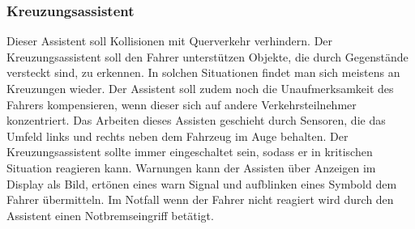         \subsubsection{Kreuzungsassistent}
        Dieser Assistent soll Kollisionen mit Querverkehr verhindern. Der Kreuzungsassistent soll den Fahrer 
        unterstützen Objekte, die durch Gegenstände versteckt sind, zu erkennen. In solchen Situationen findet 
        man sich meistens an Kreuzungen wieder. Der Assistent soll zudem noch die Unaufmerksamkeit des 
        Fahrers kompensieren, wenn dieser sich auf andere Verkehrsteilnehmer konzentriert. Das Arbeiten  
        dieses Assisten geschieht durch Sensoren, die das Umfeld links und rechts neben dem Fahrzeug  im 
        Auge behalten. Der Kreuzungsassistent sollte immer eingeschaltet sein, sodass er in kritischen Situation 
        reagieren kann. Warnungen kann der Assisten über Anzeigen im Display als Bild, ertönen eines warn 
        Signal und aufblinken eines Symbold dem Fahrer übermitteln. Im Notfall wenn der Fahrer nicht 
        reagiert wird durch den Assistent einen Notbremseingriff betätigt.
        ~\cite{kreuzungsassi.PB1} ~\cite{kreuzungsassi.PB2}